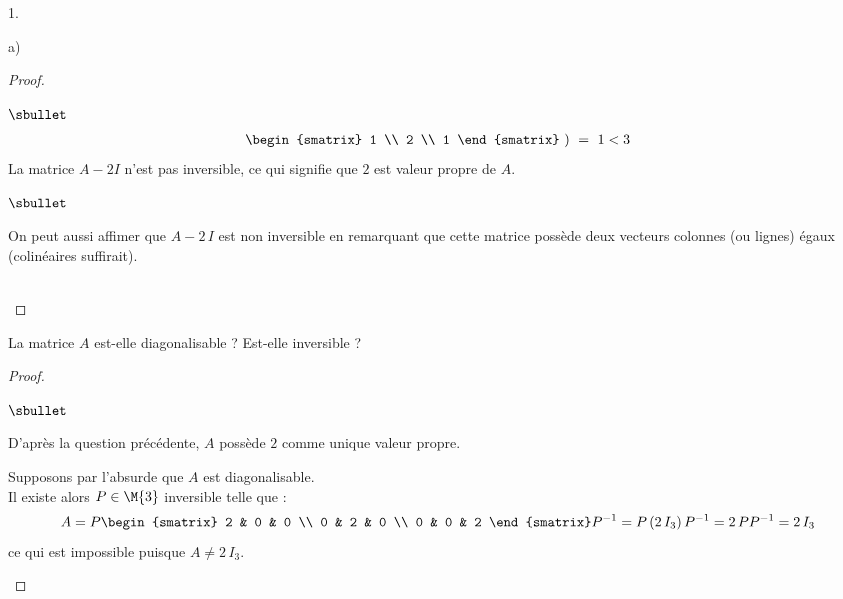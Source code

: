 \documentclass[11pt]{article}%
\begin{document}
\begin{noliste}{1.}
\begin{noliste}{a)}
\begin{proof}
\begin{noliste}{$\sbullet$}
\[\begin{array}{rcl}
{\begin{smatrix}
              1 \\ 
              2 \\
              1
            \end{smatrix} %
          } \ ) %
          \ = \ 1 <3
        \end{array}        
        \]
	La matrice $A-2I$ n'est pas inversible, ce qui signifie que
        $2$ est valeur propre de $A$.
      \end{noliste}
      \begin{remark}%
        \begin{noliste}{$\sbullet$}
        \item On peut aussi affimer que $A - 2 \, I$ est non
          inversible en remarquant que cette matrice possède deux
          vecteurs colonnes (ou lignes) égaux (colinéaires suffirait).
        \end{noliste}
      \end{remark}
      ~\\[-1.2cm]
    \end{proof}		

  \item La matrice $A$ est-elle diagonalisable ? Est-elle inversible ?
  \end{noliste}

    \begin{proof}~
      \begin{noliste}{$\sbullet$}
      \item D'après la question précédente, $A$ possède $2$ comme
        unique valeur propre. %
      \item Supposons par l'absurde que $A$ est diagonalisable.\\
        Il existe alors $P \in \M{3}$ inversible telle que : 
        \[
        A = P
        \begin{smatrix}
          2 & 0 & 0 \\
          0 & 2 & 0 \\
          0 & 0 & 2           
        \end{smatrix}
        P^{-1} %
        = %
        P \, (2 \, I_3) \, P^{-1} %
        = %
        2 \, PP^{-1} %
        = %
        2 \, I_3
        \]
        ce qui est impossible puisque $A \neq 2 \, I_3$.%
	

\end{noliste}
\end{proof}
\end{noliste}
\end{document}

